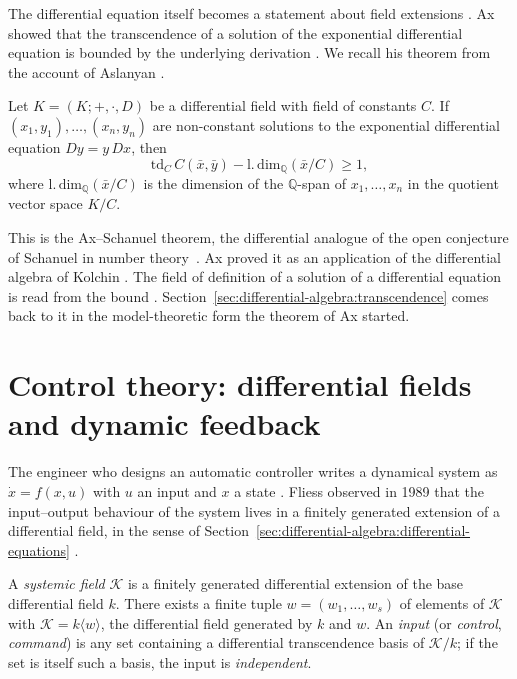 The differential equation itself becomes a statement about field extensions
\cite{Ax1971}.
Ax showed that the transcendence of a solution of the exponential differential
equation is bounded by the underlying derivation \cite[Theorem~3]{Ax1971}.
We recall his theorem from the account of Aslanyan \cite{Aslanyan2018}.

\begin{theorem}\label{thm:diffalg:ax-schanuel}
Let $K=(K;+,\cdot,D)$ be a differential field with field of constants $C$. If
$(x_1,y_1),\ldots,(x_n,y_n)$ are non-constant solutions to the exponential
differential equation $Dy=y\,Dx$, then
\[
\mathrm{td}_C\,C(\bar{x},\bar{y}) - \mathrm{l.\,dim}_{\mathbb{Q}}(\bar{x}/C) \geq 1,
\]
where $\mathrm{l.\,dim}_{\mathbb{Q}}(\bar{x}/C)$ is the dimension of the
$\mathbb{Q}$-span of $x_1,\ldots,x_n$ in the quotient vector space $K/C$.
\end{theorem}

This is the Ax--Schanuel theorem, the differential analogue of the open
conjecture of Schanuel in number theory~\cite[\S2]{Aslanyan2018}. Ax \cite{Ax1971} proved it as an
application of the differential algebra of Kolchin \cite{Kolchin1973}. The
field of definition of a solution of a differential equation is read from the
bound \cite[\S2]{Aslanyan2018}.
Section~\ref{sec:differential-algebra:transcendence} comes back to it in the
model-theoretic form the theorem of Ax started.

\section{Control theory: differential fields and dynamic feedback}\label{sec:differential-algebra:control}

The engineer who designs an automatic controller writes a dynamical system as
$\dot x=f(x,u)$ with $u$ an input and $x$ a state \cite{Fliess1989}. Fliess
observed in 1989 that the input--output behaviour of the system lives in a
finitely generated extension of a differential field, in the sense of
Section~\ref{sec:differential-algebra:differential-equations}
\cite{Fliess1989}.

\begin{definition}\label{def:diffalg:fliess-systemic-field}
A \emph{systemic field} $\mathcal{K}$ is a finitely generated differential
extension of the base differential field $k$. There exists a finite tuple
$w=(w_1,\ldots,w_s)$ of elements of $\mathcal{K}$ with
$\mathcal{K}=k\langle w\rangle$, the differential field generated by $k$ and
$w$. An \emph{input} (or \emph{control}, \emph{command}) is any set containing
a differential transcendence basis of $\mathcal{K}/k$; if the set is itself
such a basis, the input is \emph{independent}.
\end{definition}

